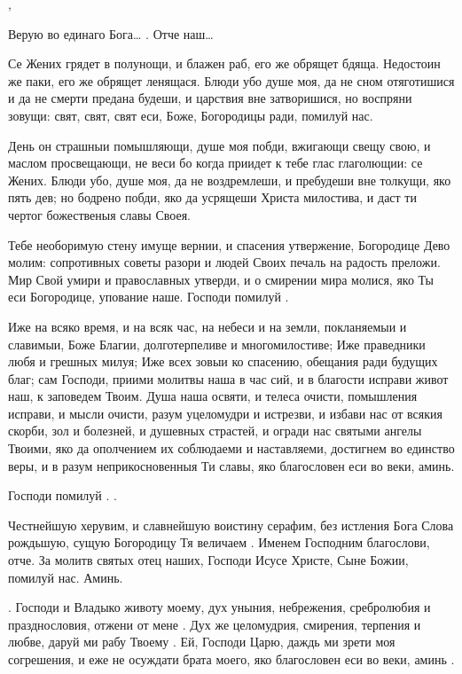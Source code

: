 \begin{mymulticols}
,  

 Верую во единаго Бога… .  Отче наш… 




Се Жених грядет в полунощи, и блажен раб, его же обрящет бдяща. Недостоин же паки, его же обрящет ленящася. Блюди убо душе моя, да не сном отяготишися и да не смерти предана будеши, и царствия вне затворишися, но воспряни зовущи: свят, свят, свят еси, Боже, Богородицы ради, помилуй нас. 

 День он страшныи помышляющи, душе моя побди, вжигающи свещу свою, и маслом просвещающи, не веси бо когда приидет к тебе глас глаголющии: се Жених. Блюди убо, душе моя, да не воздремлеши, и пребудеши вне толкущи, яко пять дев; но бодрено побди, яко да усрящеши Христа милостива, и даст ти чертог божественыя славы Своея. 

 Тебе необоримую стену имуще вернии, и спасения утвержение, Богородице Дево молим: сопротивных советы разори и людей Своих печаль на радость преложи. Мир Свой умири и православных утверди, и о смирении мира молися, яко Ты еси Богородице, упование наше. Господи помилуй . 


 Иже на всяко время, и на всяк час, на небеси и на земли, покланяемыи и славимыи, Боже Благии, долготерпеливе и многомилостиве; Иже праведники любя и грешных милуя; Иже всех зовыи ко спасению, обещания ради будущих благ; сам Господи, приими молитвы наша в час сий, и в благости исправи живот наш, к заповедем Твоим. Душа наша освяти, и телеса очисти, помышления исправи, и мысли очисти, разум уцеломудри и истрезви, и избави нас от всякия скорби, зол и болезней, и душевных страстей, и огради нас святыми ангелы Твоими, яко да ополчением их соблюдаеми и наставляеми, достигнем во единство веры, и в разум неприкосновенныя Ти славы, яко благословен еси во веки, аминь. 

 Господи помилуй . . 

Честнейшую херувим, и славнейшую воистину серафим, без истления Бога Слова рождьшую, сущую Богородицу Тя величаем . Именем Господним благослови, отче. За молитв святых отец наших, Господи Исусе Христе, Сыне Божии, помилуй нас. Аминь. 

. Господи и Владыко животу моему, дух уныния, небрежения, сребролюбия и празднословия, отжени от мене . Дух же целомудрия, смирения, терпения и любве, даруй ми рабу Твоему . Ей, Господи Царю, даждь ми зрети моя согрешения, и еже не осуждати брата моего, яко благословен еси во веки, аминь .


\end{mymulticols}
